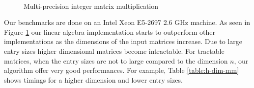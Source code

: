 \documentclass[acmtoms]{acmsmall}
\begin{document}
\begin{figure}[ht]
{	}\\
	\caption{Multi-precision integer matrix multiplication}
	\label{fig:exp-mm}
\end{figure}

Our benchmarks are done on an Intel Xeon E5-2697 2.6 GHz machine. As seen in Figure 
\ref{fig:exp-mm} our linear algebra implementation starts to outperform other implementations as 
the dimensions of the input matrices increase. Due to large entry sizes higher dimensional matrices 
become intractable. For tractable matrices, when the entry sizes are not to large compared to the 
dimension $n$, our algorithm offer very good performances. For example, Table \ref{table:h-dim-mm} 
shows timings for a higher dimension and lower entry sizes.
\end{document}
